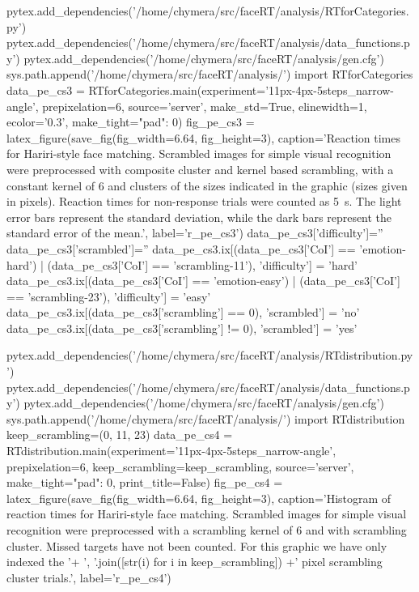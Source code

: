 \begin{pycode}[pe_cs3]
pytex.add_dependencies('/home/chymera/src/faceRT/analysis/RTforCategories.py')
pytex.add_dependencies('/home/chymera/src/faceRT/analysis/data_functions.py')
pytex.add_dependencies('/home/chymera/src/faceRT/analysis/gen.cfg')
sys.path.append('/home/chymera/src/faceRT/analysis/')
import RTforCategories
data_pe_cs3 = RTforCategories.main(experiment='11px-4px-5steps_narrow-angle', prepixelation=6, source='server', make_std=True, elinewidth=1, ecolor='0.3', make_tight={"pad": 0})
fig_pe_cs3 = latex_figure(save_fig(fig_width=6.64, fig_height=3), caption='Reaction times for Hariri-style face matching. Scrambled images for simple visual recognition were preprocessed with composite cluster and kernel based scrambling, with a constant kernel of \SI{6}{\pixel} and clusters of the sizes indicated in the graphic (sizes given in pixels). Reaction times for non-response trials were counted as \SI{5}{\second}. The light error bars represent the standard deviation, while the dark bars represent the standard error of the mean.', label='r_pe_cs3')
data_pe_cs3['difficulty']=''
data_pe_cs3['scrambled']=''
data_pe_cs3.ix[(data_pe_cs3['CoI'] == 'emotion-hard') | (data_pe_cs3['CoI'] == 'scrambling-11'), 'difficulty'] = 'hard'
data_pe_cs3.ix[(data_pe_cs3['CoI'] == 'emotion-easy') | (data_pe_cs3['CoI'] == 'scrambling-23'), 'difficulty'] = 'easy'
data_pe_cs3.ix[(data_pe_cs3['scrambling'] == 0), 'scrambled'] = 'no'
data_pe_cs3.ix[(data_pe_cs3['scrambling'] != 0), 'scrambled'] = 'yes'
\end{pycode}
\begin{pycode}[pe_cs4]
pytex.add_dependencies('/home/chymera/src/faceRT/analysis/RTdistribution.py')
pytex.add_dependencies('/home/chymera/src/faceRT/analysis/data_functions.py')
pytex.add_dependencies('/home/chymera/src/faceRT/analysis/gen.cfg')
sys.path.append('/home/chymera/src/faceRT/analysis/')
import RTdistribution
keep_scrambling=(0, 11, 23)
data_pe_cs4 = RTdistribution.main(experiment='11px-4px-5steps_narrow-angle', prepixelation=6, keep_scrambling=keep_scrambling, source='server', make_tight={"pad": 0}, print_title=False)
fig_pe_cs4 = latex_figure(save_fig(fig_width=6.64, fig_height=3), caption='Histogram of reaction times for Hariri-style face matching. Scrambled images for simple visual recognition were preprocessed with a scrambling kernel of \SI{6}{\pixel} and with scrambling cluster. Missed targets have not been counted. For this graphic we have only indexed the '+ ', '.join([str(i) for i in keep_scrambling]) +' pixel scrambling cluster trials.', label='r_pe_cs4')
\end{pycode}
